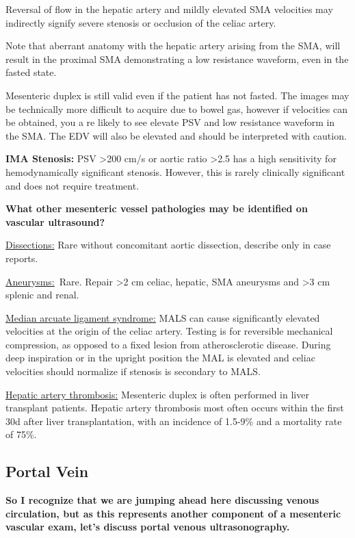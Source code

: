 \documentclass[
]{book}
\begin{document}
Reversal of flow in the hepatic artery and mildly elevated SMA
velocities may indirectly signify severe stenosis or occlusion of the
celiac artery.

Note that aberrant anatomy with the hepatic artery arising from the SMA,
will result in the proximal SMA demonstrating a low resistance waveform,
even in the fasted state.\citep{pellerito2019}

Mesenteric duplex is still valid even if the patient has not fasted. The
images may be technically more difficult to acquire due to bowel gas,
however if velocities can be obtained, you a re likely to see elevate
PSV and low resistance waveform in the SMA. The EDV will also be
elevated and should be interpreted with caution.

\textbf{IMA Stenosis:} PSV \textgreater200 cm/s or aortic ratio \textgreater2.5 has a high
sensitivity for hemodynamically significant stenosis. However, this is
rarely clinically significant and does not require treatment.

\textbf{What other mesenteric vessel pathologies may be identified on vascular
ultrasound?}

\uline{Dissections:} Rare without concomitant aortic dissection,
describe only in case reports.\citep{gouëffic2002, oglesby2006}

\uline{Aneurysms:}~Rare. Repair \textgreater2 cm celiac, hepatic, SMA
aneurysms and \textgreater3 cm splenic and renal.

\uline{Median arcuate ligament syndrome:} MALS can cause
significantly elevated velocities at the origin of the celiac artery.
Testing is for reversible mechanical compression, as opposed to a fixed
lesion from atherosclerotic disease. During deep inspiration or in the
upright position the MAL is elevated and celiac velocities should
normalize if stenosis is secondary to MALS.\citep{tembey2015}

\uline{Hepatic artery thrombosis:} Mesenteric duplex is often
performed in liver transplant patients. Hepatic artery thrombosis most
often occurs within the first 30d after liver transplantation, with an
incidence of 1.5-9\% and a mortality rate of 75\%.\citep{garcía-criado2009, sanyal2012}

\hypertarget{portal-vein}{%
\subsection{Portal Vein}\label{portal-vein}}

\textbf{So I recognize that we are jumping ahead here discussing venous
circulation, but as this represents another component of a mesenteric
vascular exam, let's discuss portal venous ultrasonography.}
\end{document}
